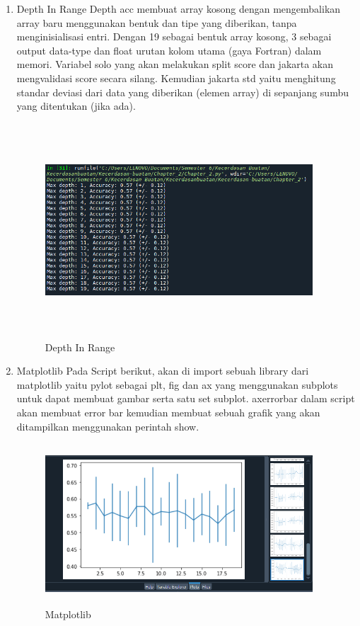 \begin{enumerate}
\item Depth In Range
\newline Depth acc membuat array kosong dengan mengembalikan array baru menggunakan bentuk dan tipe yang diberikan, tanpa menginisialisasi entri. Dengan 19 sebagai bentuk array kosong, 3 sebagai output data-type dan float urutan kolom utama (gaya Fortran) dalam memori. Variabel solo yang akan melakukan
split score dan jakarta akan mengvalidasi score secara silang. Kemudian jakarta std yaitu menghitung standar deviasi dari data yang diberikan (elemen array) di sepanjang sumbu yang ditentukan (jika ada).
\begin{figure}[!htbp]
	\centering
	\includegraphics[width=10cm,height=8cm]{figures/Cp2-j.png}
	\caption{Depth In Range}
	\label{penanda}
\end{figure}

\item Matplotlib
\newline Pada Script berikut, akan di import sebuah library dari matplotlib yaitu pylot sebagai plt, fig dan ax yang menggunakan subplots untuk dapat membuat gambar serta satu set subplot. axerrorbar dalam script akan membuat error bar kemudian membuat sebuah grafik yang akan ditampilkan menggunakan perintah show.
\begin{figure}[!htbp]
	\centering
	\includegraphics[width=10cm,height=6cm]{figures/Cp2-k.png}
	\caption{Matplotlib}
	\label{penanda}
\end{figure}
\end{enumerate}